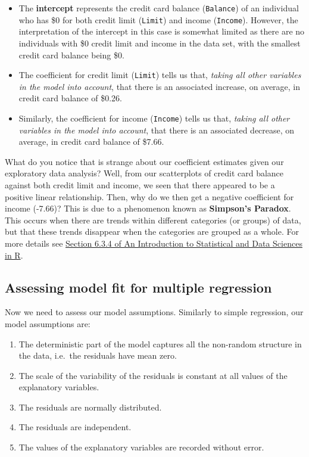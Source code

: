 \documentclass[
  letterpaper,
  DIV=11,
  numbers=noendperiod]{scrartcl}
\providecommand{\tightlist}{%
  \setlength{\itemsep}{0pt}\setlength{\parskip}{0pt}}\usepackage{longtable,booktabs,array}
\begin{document}
\begin{itemize}
\tightlist
\item
  The \textbf{intercept} represents the credit card balance
  (\texttt{Balance}) of an individual who has \$0 for both credit limit
  (\texttt{Limit}) and income (\texttt{Income}). However, the
  interpretation of the intercept in this case is somewhat limited as
  there are no individuals with \$0 credit limit and income in the data
  set, with the smallest credit card balance being \$0.
\item
  The coefficient for credit limit (\texttt{Limit}) tells us that,
  \emph{taking all other variables in the model into account}, that
  there is an associated increase, on average, in credit card balance of
  \$0.26.
\item
  Similarly, the coefficient for income (\texttt{Income}) tells us that,
  \emph{taking all other variables in the model into account}, that
  there is an associated decrease, on average, in credit card balance of
  \$7.66.
\end{itemize}

What do you notice that is strange about our coefficient estimates given
our exploratory data analysis? Well, from our scatterplots of credit
card balance against both credit limit and income, we seen that there
appeared to be a positive linear relationship. Then, why do we then get
a negative coefficient for income (-7.66)? This is due to a phenomenon
known as \textbf{Simpson's Paradox}. This occurs when there are trends
within different categories (or groups) of data, but that these trends
disappear when the categories are grouped as a whole. For more details
see
\href{https://moderndive.com/6-multiple-regression.html\#simpsonsparadox}{Section
6.3.4 of An Introduction to Statistical and Data Sciences in R}.

\subsection{Assessing model fit for multiple
regression}\label{assessing-model-fit-for-multiple-regression}

Now we need to assess our model assumptions. Similarly to simple
regression, our model assumptions are:

\begin{enumerate}
\def\labelenumi{\arabic{enumi}.}
\tightlist
\item
  The deterministic part of the model captures all the non-random
  structure in the data, i.e.~the residuals have mean zero.
\item
  The scale of the variability of the residuals is constant at all
  values of the explanatory variables.
\item
  The residuals are normally distributed.
\item
  The residuals are independent.
\item
  The values of the explanatory variables are recorded without error.
\end{enumerate}
\end{document}
